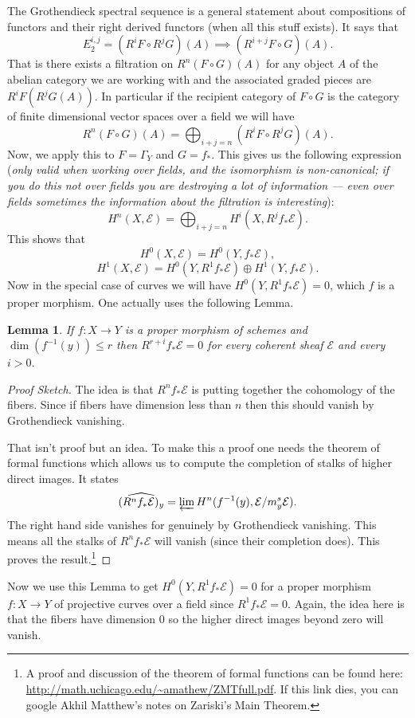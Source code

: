 \documentclass[12pt]{article}
\numberwithin{equation}{section}
\newtheorem{lemma}[theorem]{Lemma}
\theoremstyle{definition}
\theoremstyle{remark}
\newcommand{\Ecal}{\mathcal{E}}
\begin{document}
The Grothendieck spectral sequence is a general statement about compositions of functors and their right derived functors (when all this stuff exists). It says that 
$$ E_2^{i,j}=(R^iF\circ R^jG)(A) \implies (R^{i+j}F\circ G)(A).$$
That is there exists a filtration on $R^{n}(F\circ G)(A)$ for any object $A$ of the abelian category we are working with and the associated graded pieces are $R^iF(R^jG(A))$. 
In particular if the recipient category of $F\circ G$ is the category of finite dimensional vector spaces over a field we will have 
$$ R^{n}(F\circ G)(A) = \bigoplus_{i+j=n} (R^iF \circ R^jG)(A).$$
Now, we apply this to $F=\Gamma_Y$ and $G=f_*$. 
This gives us the following expression (\emph{only valid when working over fields, and the isomorphism is non-canonical; if you do this not over fields you are destroying a lot of information --- even over fields sometimes the information about the filtration is interesting}):
$$ H^n(X,\Ecal) = \bigoplus_{i+j=n} H^i(X,R^jf_*\Ecal).$$
This shows that 
$$ H^0(X,\Ecal) = H^0(Y,f_*\Ecal),$$
$$ H^1(X,\Ecal) = H^0(Y,R^1f_*\Ecal) \oplus H^1(Y,f_*\Ecal).$$
Now in the special case of curves we will have $H^0(Y,R^1f_*\Ecal)=0$, which $f$ is a proper morphism. 
One actually uses the following Lemma.
\begin{lemma}
	If $f:X\to Y$ is a proper morphism of schemes and $\dim(f^{-1}(y))\leq r$ then $R^{r+i}f_*\Ecal=0$ for every coherent sheaf $\Ecal$ and every $i>0$.  
\end{lemma}
\begin{proof}[Proof Sketch]
	The idea is that $R^nf_*\Ecal$ is putting together the cohomology of the fibers. 
	Since if fibers have dimension less than $n$ then this should vanish by Grothendieck vanishing. 
	
	That isn't proof but an idea. 
	To make this a proof one needs the theorem of formal functions which allows us to compute the completion of stalks of higher direct images. 
	It states 
	$$ \widehat{(R^nf_*\Ecal)_y} = \varprojlim H^n(f^{-1}(y), \Ecal/m_y^s\Ecal). $$
	The right hand side vanishes for genuinely by Grothendieck vanishing. 
	This means all the stalks of $R^nf_*\Ecal$ will vanish (since their completion does).
	This proves the result.\footnote{
		A proof and discussion of the theorem of formal functions can be found here: \url{http://math.uchicago.edu/~amathew/ZMTfull.pdf}. If this link dies, you can google Akhil Matthew's notes on Zariski's Main Theorem.	
	}
\end{proof}
Now we use this Lemma to get $H^0(Y,R^1f_*\Ecal)=0$ for a proper morphism $f:X\to Y$ of projective curves over a field since $R^1f_*\Ecal=0$.
Again, the idea here is that the fibers have dimension $0$ so the higher direct images beyond zero will vanish.
\end{document}
